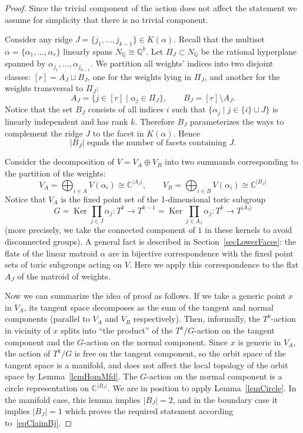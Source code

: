 \documentclass[english,12pt,oneside]{amsproc}
\DeclareMathOperator{\Ker}{Ker}
\newcommand{\Co}{\mathbb{C}}
\newcommand{\Qo}{\mathbb{Q}}
\newcommand{\Nq}{N_\Qo}
\numberwithin{equation}{section}
\theoremstyle{plain}
\theoremstyle{definition}
\theoremstyle{remark}
\begin{document}
\begin{proof}
Since the trivial component of the action does not affect the statement we assume for simplicity that there is no trivial component.

Consider any ridge $J=\{j_1,\ldots,j_{k-1}\}\in K(\alpha)$. Recall that the multiset $\alpha=\{\alpha_1,\ldots,\alpha_r\}$ linearly spans $\Nq\cong\Qo^k$. Let $\Pi_J\subset\Nq$ be the rational hyperplane spanned by $\alpha_{j_1},\ldots,\alpha_{j_{k-1}}$. We partition all weights' indices into two disjoint classes: $[r]=A_J\sqcup B_J$, one for the weights lying in $\Pi_J$, and another for the weights transversal to $\Pi_J$:
\[
A_J=\{j\in[r]\mid \alpha_j\in \Pi_J\},\qquad B_J=[r]\setminus A_J.
\]
Notice that the set $B_J$ consists of all indices $i$ such that $\{\alpha_j\mid j\in \{i\}\sqcup J\}$ is linearly independent and has rank $k$. Therefore $B_J$ parameterizes the ways to complement the ridge $J$ to the facet in $K(\alpha)$. Hence
\begin{equation}\label{eqClaimBj}
  |B_J| \text{ equals the number of facets containing } J.
\end{equation}

Consider the decomposition of $V=V_A\oplus V_B$ into two summands corresponding to the partition of the weights:
\[
V_A=\bigoplus_{i\in A}V(\alpha_i)\cong \Co^{|A_J|}, \qquad  V_B=\bigoplus_{i\in B}V(\alpha_i)\cong \Co^{|B_J|}
\]
Notice that $V_A$ is the fixed point set of the 1-dimensional toric subgroup
\[
G=\Ker\prod_{j\in J}\alpha_j\colon T^k\to T^{k-1}=\Ker\prod_{j\in A_J}\alpha_j\colon T^k\to T^{|A_J|}
\]
(more precisely, we take the connected component of $1$ in these kernels to avoid disconnected groups). A general fact is described in Section~\ref{secLowerFaces}: the flats of the linear matroid $\alpha$ are in bijective correspondence with the fixed point sets of toric subgroups acting on $V$. Here we apply this correspondence to the flat $A_J$ of the matroid of weights.

Now we can summarize the idea of proof as follows. If we take a generic point $x$ in $V_A$, its tangent space decomposes as the sum of the tangent and normal components (parallel to $V_A$ and $V_B$ respectively). Then, informally, the $T^k$-action in vicinity of $x$ splits into ``the product'' of the $T^k/G$-action on the tangent component and the $G$-action on the normal component. Since $x$ is generic in $V_A$, the action of $T^k/G$ is free on the tangent component, so the orbit space of the tangent space is a manifold, and does not affect the local topology of the orbit space by Lemma~\ref{lemHomMfd}. The $G$-action on the normal component is a circle representation on $\Co^{|B_J|}$. We are in position to apply Lemma~\ref{lemCircle}. In the manifold case, this lemma implies $|B_J|=2$, and in the boundary case it implies $|B_J|=1$ which proves the required statement according to~\eqref{eqClaimBj}.


\end{proof}
\end{document}
